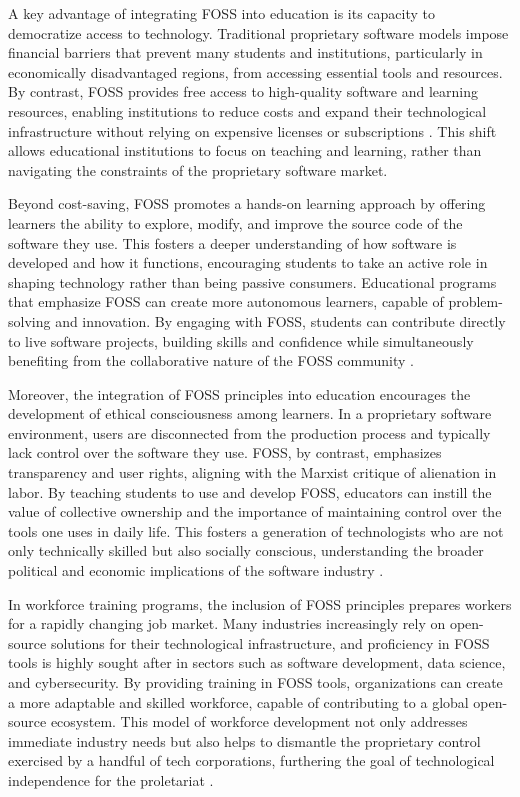 \begin{refsection}
A key advantage of integrating FOSS into education is its capacity to democratize access to technology. Traditional proprietary software models impose financial barriers that prevent many students and institutions, particularly in economically disadvantaged regions, from accessing essential tools and resources. By contrast, FOSS provides free access to high-quality software and learning resources, enabling institutions to reduce costs and expand their technological infrastructure without relying on expensive licenses or subscriptions \cite[pp.~28-30]{stallman2010}. This shift allows educational institutions to focus on teaching and learning, rather than navigating the constraints of the proprietary software market.

Beyond cost-saving, FOSS promotes a hands-on learning approach by offering learners the ability to explore, modify, and improve the source code of the software they use. This fosters a deeper understanding of how software is developed and how it functions, encouraging students to take an active role in shaping technology rather than being passive consumers. Educational programs that emphasize FOSS can create more autonomous learners, capable of problem-solving and innovation. By engaging with FOSS, students can contribute directly to live software projects, building skills and confidence while simultaneously benefiting from the collaborative nature of the FOSS community \cite[pp.~58-60]{weber2005}.

Moreover, the integration of FOSS principles into education encourages the development of ethical consciousness among learners. In a proprietary software environment, users are disconnected from the production process and typically lack control over the software they use. FOSS, by contrast, emphasizes transparency and user rights, aligning with the Marxist critique of alienation in labor. By teaching students to use and develop FOSS, educators can instill the value of collective ownership and the importance of maintaining control over the tools one uses in daily life. This fosters a generation of technologists who are not only technically skilled but also socially conscious, understanding the broader political and economic implications of the software industry \cite[pp.~90-92]{benkler2010}.

In workforce training programs, the inclusion of FOSS principles prepares workers for a rapidly changing job market. Many industries increasingly rely on open-source solutions for their technological infrastructure, and proficiency in FOSS tools is highly sought after in sectors such as software development, data science, and cybersecurity. By providing training in FOSS tools, organizations can create a more adaptable and skilled workforce, capable of contributing to a global open-source ecosystem. This model of workforce development not only addresses immediate industry needs but also helps to dismantle the proprietary control exercised by a handful of tech corporations, furthering the goal of technological independence for the proletariat \cite[pp.~32-34]{fitzgerald2007}.


\end{refsection}
